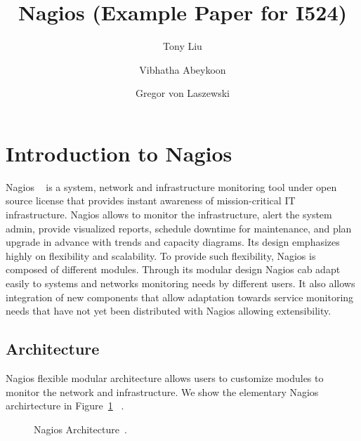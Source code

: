 \documentclass[9pt,twocolumn,twoside]{styles/osajnl}
\title{\centering%
Nagios (Example Paper for I524)}
\author[1]{Tony Liu}
\author[1]{Vibhatha Abeykoon}
\author[1]{Gregor von Laszewski}
\affil[1]{School of Informatics and Computing, Bloomington, IN 47408, U.S.A.}
\begin{document}
\maketitle

\section{Introduction to Nagios}

Nagios ~\cite{www-nagios, wiki-nagios} is a system, network and
infrastructure monitoring tool under open source license that provides
instant awareness of mission-critical IT infrastructure. Nagios allows
to monitor the infrastructure, alert the system admin, provide
visualized reports, schedule downtime for maintenance, and plan
upgrade in advance with trends and capacity diagrams. Its design
emphasizes highly on flexibility and scalability. To provide such
flexibility, Nagios is composed of different modules. Through its
modular design Nagios cab adapt easily to systems and networks
monitoring needs by different users. It also allows integration of new
components that allow adaptation towards service monitoring needs that
have not yet been distributed with Nagios allowing extensibility.

\subsection{Architecture}

Nagios \cite{nagios-paper-2012} flexible modular architecture allows
users to customize modules to monitor the network and
infrastructure. We show the elementary Nagios archirtecture in
Figure~\ref{fig:Nagios-architecture} ~\cite{nagios-book}.

\begin{figure}[htbp]
\centering
{}
\caption{Nagios Architecture~\cite{nagios-book}.}
\label{fig:Nagios-architecture}
\end{figure}
\end{document}
